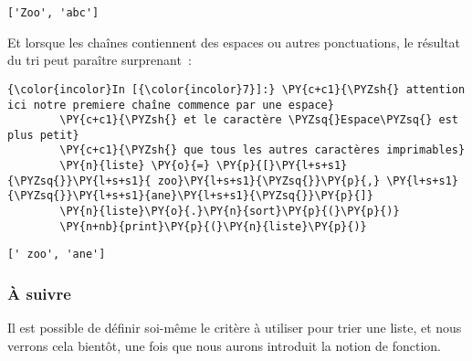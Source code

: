     \begin{Verbatim}[commandchars=\\\{\}]
['Zoo', 'abc']

    \end{Verbatim}

    Et lorsque les chaînes contiennent des espaces ou autres ponctuations,
le résultat du tri peut paraître surprenant~:

    \begin{Verbatim}[commandchars=\\\{\}]
{\color{incolor}In [{\color{incolor}7}]:} \PY{c+c1}{\PYZsh{} attention ici notre premiere chaîne commence par une espace}
        \PY{c+c1}{\PYZsh{} et le caractère \PYZsq{}Espace\PYZsq{} est plus petit}
        \PY{c+c1}{\PYZsh{} que tous les autres caractères imprimables}
        \PY{n}{liste} \PY{o}{=} \PY{p}{[}\PY{l+s+s1}{\PYZsq{}}\PY{l+s+s1}{ zoo}\PY{l+s+s1}{\PYZsq{}}\PY{p}{,} \PY{l+s+s1}{\PYZsq{}}\PY{l+s+s1}{ane}\PY{l+s+s1}{\PYZsq{}}\PY{p}{]}
        \PY{n}{liste}\PY{o}{.}\PY{n}{sort}\PY{p}{(}\PY{p}{)}
        \PY{n+nb}{print}\PY{p}{(}\PY{n}{liste}\PY{p}{)}
\end{Verbatim}


    \begin{Verbatim}[commandchars=\\\{\}]
[' zoo', 'ane']

    \end{Verbatim}

    \hypertarget{uxe0-suivre}{%
\subsubsection{À suivre}\label{uxe0-suivre}}

    Il est possible de définir soi-même le critère à utiliser pour trier une
liste, et nous verrons cela bientôt, une fois que nous aurons introduit
la notion de fonction.